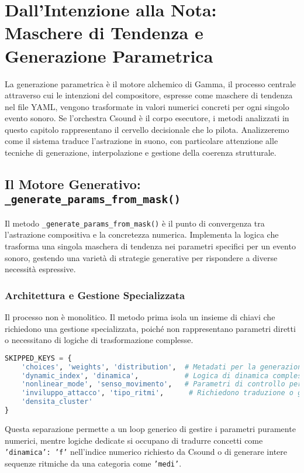 
\section{Dall'Intenzione alla Nota: Maschere di Tendenza e Generazione Parametrica}
La generazione parametrica è il motore alchemico di Gamma, il processo centrale attraverso cui le intenzioni del compositore, espresse come  maschere di tendenza  nel file YAML, vengono trasformate in valori numerici concreti per ogni singolo evento sonoro. Se l'orchestra Csound è il corpo esecutore, i metodi analizzati in questo capitolo rappresentano il cervello decisionale che lo pilota. Analizzeremo come il sistema traduce l'astrazione in suono, con particolare attenzione alle tecniche di generazione, interpolazione e gestione della coerenza strutturale.
\subsection{Il Motore Generativo: \texttt{\_generate\_params\_from\_mask()}}
Il metodo \texttt{\_generate\_params\_from\_mask()} è il punto di convergenza tra l'astrazione compositiva e la concretezza numerica. Implementa la logica che trasforma una singola maschera di tendenza nei parametri specifici per un evento sonoro, gestendo una varietà di strategie generative per rispondere a diverse necessità espressive.
\subsubsection{Architettura e Gestione Specializzata}
Il processo non è monolitico. Il metodo prima isola un insieme di chiavi che richiedono una gestione specializzata, poiché non rappresentano parametri diretti o necessitano di logiche di trasformazione complesse.

\begin{lstlisting}[language=Python]
SKIPPED_KEYS = {
    'choices', 'weights', 'distribution',  # Metadati per la generazione
    'dynamic_index', 'dinamica',           # Logica di dinamica complessa
    'nonlinear_mode', 'senso_movimento',   # Parametri di controllo per Csound
    'inviluppo_attacco', 'tipo_ritmi',      # Richiedono traduzione o generazione complessa
    'densita_cluster'                      
}
\end{lstlisting}
Questa separazione permette a un loop generico di gestire i parametri puramente numerici, mentre logiche dedicate si occupano di tradurre concetti come \texttt{'dinamica': 'f'} nell'indice numerico richiesto da Csound o di generare intere sequenze ritmiche da una categoria come \texttt{'medi'}.
